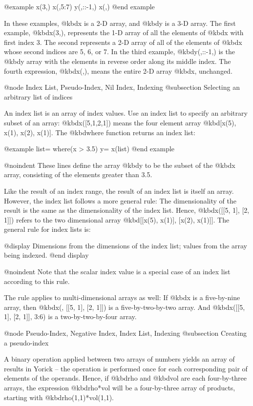 @example
x(3,)
x(,5:7)
y(,::-1,)
x(,)
@end example

In these examples, @kbd{x} is a 2-D array, and @kbd{y} is a 3-D array.
The first example, @kbd{x(3,)}, represents the 1-D array of all the
elements of @kbd{x} with first index 3.  The second represents a 2-D
array of all of the elements of @kbd{x} whose second indices are 5, 6,
or 7.  In the third example, @kbd{y(,::-1,)} is the @kbd{y} array with
the elements in reverse order along its middle index.  The fourth
expression, @kbd{x(,)}, means the entire 2-D array @kbd{x}, unchanged.





@node    Index List, Pseudo-Index, Nil Index, Indexing
@subsection Selecting an arbitrary list of indices

An index list is an array of index values.  Use an index list to specify
an arbitrary subset of an array: @kbd{x([5,1,2,1])} means the four
element array @kbd{[x(5), x(1), x(2), x(1)]}.  The @kbd{where} function
returns an index list:

@example
list= where(x > 3.5)
y= x(list)
@end example

@noindent
These lines define the array @kbd{y} to be the subset of the @kbd{x}
array, consisting of the elements greater than 3.5.

Like the result of an index range, the result of an index list is itself
an array.  However, the index list follows a more general rule: The
dimensionality of the result is the same as the dimensionality of the
index list.  Hence, @kbd{x([[5, 1], [2, 1]])} refers to the two
dimensional array @kbd{[[x(5), x(1)], [x(2), x(1)]]}.  The general rule
for index lists is:

@display
Dimensions from the dimensions of the index list; values from the array
being indexed.
@end display

@noindent
Note that the scalar index value is a special case of an index list
according to this rule.

The rule applies to multi-dimensional arrays as well: If @kbd{x} is a
five-by-nine array, then @kbd{x(, [[5, 1], [2, 1]])} is a
five-by-two-by-two array.  And @kbd{x([[5, 1], [2, 1]], 3:6)} is a
two-by-two-by-four array.



@node    Pseudo-Index, Negative Index, Index List, Indexing
@subsection Creating a pseudo-index

A binary operation applied between two arrays of numbers yields an array
of results in Yorick -- the operation is performed once for each
corresponding pair of elements of the operands.  Hence, if @kbd{rho} and
@kbd{vol} are each four-by-three arrays, the expression @kbd{rho*vol}
will be a four-by-three array of products, starting with
@kbd{rho(1,1)*vol(1,1)}.

